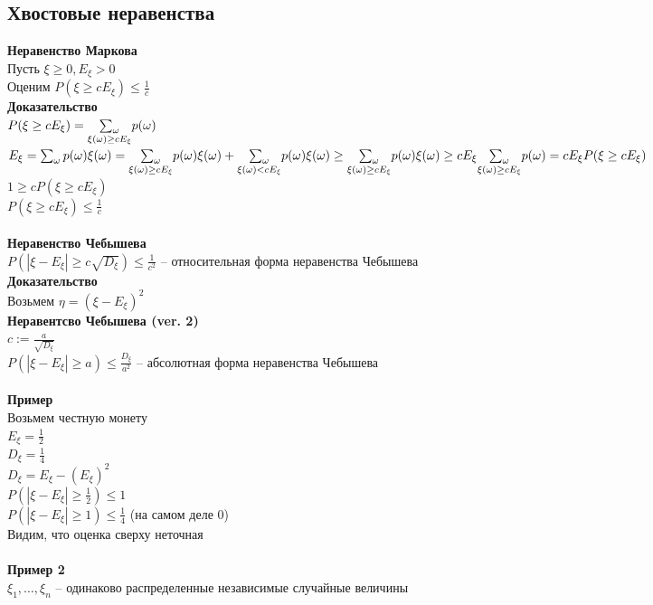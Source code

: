 \documentclass[12pt]{article}
\begin{document}
\subsection{Хвостовые неравенства}
\textbf{Неравенство Маркова}\\
Пусть $\xi \geq 0, E_\xi > 0$\\
Оценим $P(\xi \geq cE_\xi) \leq \frac1c$\\
\textbf{Доказательство}\\
$P(\xi \geq cE_\xi) = \underset{\xi(\omega) \geq cE_\xi}{\sum_{\omega}} p(\omega)$\\
$E_\xi = \sum_\omega p(\omega)\xi(\omega) = \underset{\xi(\omega) \geq cE_\xi}{\sum_{\omega}} p(\omega)\xi(\omega) + \underset{\xi(\omega) < cE_\xi}{\sum_{\omega}} p(\omega)\xi(\omega) \geq \underset{\xi(\omega) \geq cE_\xi}{\sum_{\omega}} p(\omega)\xi(\omega) \geq cE_\xi \underset{\xi(\omega) \geq cE_\xi}{\sum_{\omega}} p(\omega) = cE_\xi P(\xi \geq cE_\xi)$\\
$1 \geq cP(\xi \geq cE_\xi)$\\
$P(\xi \geq cE_\xi) \leq \frac1c$\\\\
\textbf{Неравенство Чебышева}\\
$P(|\xi - E_\xi| \geq c\sqrt{D_\xi}) \leq \frac1{c^2}$  -- относительная форма неравенства Чебышева\\
\textbf{Доказательство}\\
Возьмем $\eta = (\xi - E_\xi)^2$\\
\textbf{Неравентсво Чебышева (ver. 2)}\\
$c := \frac{a}{\sqrt{D_\xi}}$\\
$P(|\xi - E_\xi| \geq a) \leq \frac{D_\xi}{a^2}$ -- абсолютная форма неравенства Чебышева\\\\
\textbf{Пример}\\
Возьмем честную монету\\
$E_\xi = \frac12$\\
$D_\xi = \frac14$\\
$D_\xi = E_\xi - (E_\xi)^2$\\
$P(|\xi - E_\xi| \geq \frac12) \leq 1$\\
$P(|\xi - E_\xi| \geq 1) \leq \frac14$ (на самом деле 0)\\
Видим, что оценка сверху неточная\\\\
\textbf{Пример 2}\\
$\xi_1, \ldots, \xi_n$ -- одинаково распределенные независимые случайные величины\\
\end{document}
